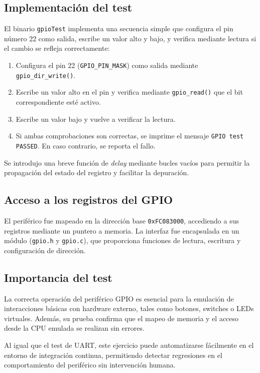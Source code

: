 \subsection*{Implementación del test}

El binario \texttt{gpioTest} implementa una secuencia simple que configura el pin número 22 como salida, escribe un valor alto y bajo, y verifica mediante lectura si el cambio se refleja correctamente:

\begin{enumerate}
    \item Configura el pin 22 (\texttt{GPIO\_PIN\_MASK}) como salida mediante \texttt{gpio\_dir\_write()}.
    \item Escribe un valor alto en el pin y verifica mediante \texttt{gpio\_read()} que el bit correspondiente esté activo.
    \item Escribe un valor bajo y vuelve a verificar la lectura.
    \item Si ambas comprobaciones son correctas, se imprime el mensaje \texttt{GPIO test PASSED}. En caso contrario, se reporta el fallo.
\end{enumerate}

Se introdujo una breve función de \emph{delay} mediante bucles vacíos para permitir la propagación del estado del registro y facilitar la depuración.

\subsection*{Acceso a los registros del GPIO}

El periférico fue mapeado en la dirección base \texttt{0xFC083000}, accediendo a sus registros mediante un puntero a memoria. La interfaz fue encapsulada en un módulo (\texttt{gpio.h} y \texttt{gpio.c}), que proporciona funciones de lectura, escritura y configuración de dirección.

\subsection*{Importancia del test}

La correcta operación del periférico GPIO es esencial para la emulación de interacciones básicas con hardware externo, tales como botones, switches o LEDs virtuales. Además, su prueba confirma que el mapeo de memoria y el acceso desde la CPU emulada se realizan sin errores.

Al igual que el test de UART, este ejercicio puede automatizarse fácilmente en el entorno de integración continua, permitiendo detectar regresiones en el comportamiento del periférico sin intervención humana.

